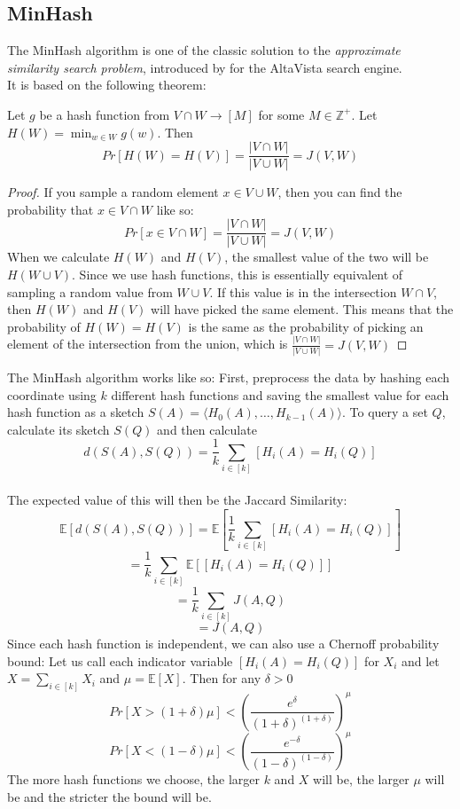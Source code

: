 \subsection{MinHash}
The MinHash algorithm is one of the classic solution to the \textit{approximate similarity search problem}, introduced by \citet{broder1997minhash} for the AltaVista search engine.\\
It is based on the following theorem:
\begin{theorem}
    \label{thm:minhash}
    Let $g$ be a hash function from $V \cap W \rightarrow [M]$ for some $M \in \mathbb{Z}^+$. Let $H(W)=\min_{w\in W} g(w)$. Then
    $$Pr[H(W)=H(V)]=\frac{|V\cap W|}{|V \cup W|}= J(V,W)$$
\end{theorem}
\begin{proof}
    If you sample a random element $x \in V \cup W$, then you can find the probability that $x \in V\cap W$ like so:
    $$Pr[x\in V \cap W]=\frac{|V\cap W|}{|V \cup W|}= J(V,W)$$
    When we calculate $H(W)$ and $H(V)$, the smallest value of the two will be $H(W\cup V)$. Since we use hash functions, this is essentially equivalent of sampling a random value from $W\cup V$. If this value is in the intersection $W\cap V$, then $H(W)$ and $H(V)$ will have picked the same element. This means that the probability of $H(W)=H(V)$ is the same as the probability of picking an element of the intersection from the union, which is $\frac{|V\cap W|}{|V\cup W|}=J(V,W)$
\end{proof}
The MinHash algorithm works like so: First, preprocess the data by hashing each coordinate using $k$ different hash functions and saving the smallest value for each hash function as a sketch $S(A)=\langle H_0(A), \dots, H_{k-1}(A)\rangle$.
To query a set $Q$, calculate its sketch $S(Q)$ and then calculate $$d(S(A),S(Q))=\frac{1}{k}\sum_{i\in [k]}[H_i(A)=H_i(Q)]$$\\
The expected value of this will then be the Jaccard Similarity:
$$\mathbb{E}[d(S(A),S(Q))]=\mathbb{E}[\frac{1}{k}\sum_{i\in [k]}[H_i(A)=H_i(Q)]]$$
$$=\frac{1}{k}\sum_{i\in [k]}\mathbb{E}[[H_i(A)=H_i(Q)]]$$
$$=\frac{1}{k}\sum_{i\in [k]}J(A,Q)$$
$$=J(A,Q)$$
Since each hash function is independent, we can also use a Chernoff probability bound: Let us call each indicator variable $[H_i(A)=H_i(Q)]$ for $X_i$ and let $X=\sum_{i\in [k]}X_i$ and $\mu = \mathbb{E}[X]$. Then for any $\delta > 0$
$$Pr[X > (1+\delta)\mu] < \left(\frac{e^\delta}{(1+\delta)^{(1+\delta)}}\right)^\mu$$
$$Pr[X < (1-\delta)\mu] < \left(\frac{e^{-\delta}}{(1-\delta)^{(1-\delta)}}\right)^\mu$$
The more hash functions we choose, the larger $k$ and $X$ will be, the larger $\mu$ will be and the stricter the bound will be. 
